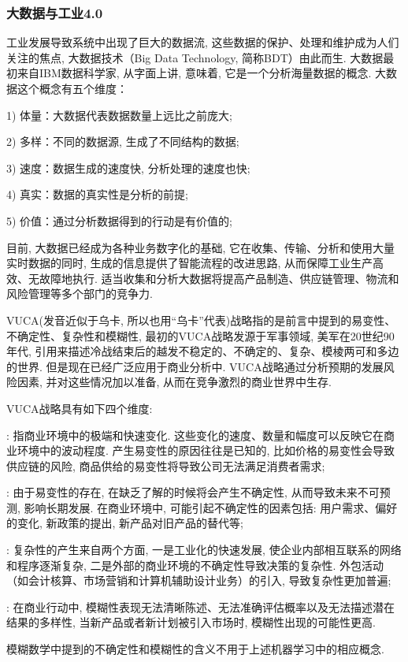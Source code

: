 \subsubsection{大数据与工业4.0}

工业发展导致系统中出现了巨大的数据流, 这些数据的保护、处理和维护成为人们关注的焦点, 大数据技术（Big Data Technology, 简称BDT）由此而生. 大数据最初来自IBM数据科学家, 从字面上讲, 意味着, 它是一个分析海量数据的概念.
大数据这个概念有五个维度：

1) 体量：大数据代表数据数量上远比之前庞大;

2) 多样：不同的数据源, 生成了不同结构的数据;

3) 速度：数据生成的速度快, 分析处理的速度也快;

4) 真实：数据的真实性是分析的前提;

5) 价值：通过分析数据得到的行动是有价值的;

目前, 大数据已经成为各种业务数字化的基础, 它在收集、传输、分析和使用大量实时数据的同时, 生成的信息提供了智能流程的改进思路, 从而保障工业生产高效、无故障地执行. 适当收集和分析大数据将提高产品制造、供应链管理、物流和风险管理等多个部门的竞争力.

VUCA(发音近似于乌卡, 所以也用“乌卡”代表)战略指的是前言中提到的易变性、不确定性、复杂性和模糊性, 最初的VUCA战略发源于军事领域, 美军在20世纪90年代, 引用来描述冷战结束后的越发不稳定的、不确定的、复杂、模棱两可和多边的世界. 但是现在已经广泛应用于商业分析中. VUCA战略通过分析预期的发展风险因素, 并对这些情况加以准备, 从而在竞争激烈的商业世界中生存.

VUCA战略具有如下四个维度:

: 指商业环境中的极端和快速变化. 这些变化的速度、数量和幅度可以反映它在商业环境中的波动程度. 产生易变性的原因往往是已知的, 比如价格的易变性会导致供应链的风险, 商品供给的易变性将导致公司无法满足消费者需求;

: 由于易变性的存在, 在缺乏了解的时候将会产生不确定性, 从而导致未来不可预测, 影响长期发展. 在商业环境中, 可能引起不确定性的因素包括: 用户需求、偏好的变化, 新政策的提出, 新产品对旧产品的替代等;

: 复杂性的产生来自两个方面, 一是工业化的快速发展, 使企业内部相互联系的网络和程序逐渐复杂, 二是外部的商业环境的不确定性导致决策的复杂性. 外包活动（如会计核算、市场营销和计算机辅助设计业务）的引入, 导致复杂性更加普遍;

: 在商业行动中, 模糊性表现无法清晰陈述、无法准确评估概率以及无法描述潜在结果的多样性, 当新产品或者新计划被引入市场时, 模糊性出现的可能性更高.
\begin{remark}
模糊数学中提到的不确定性和模糊性的含义不用于上述机器学习中的相应概念.
\end{remark}
